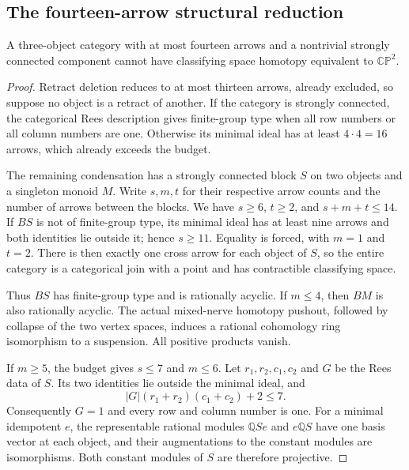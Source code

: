 \subsection{The fourteen-arrow structural reduction}

\begin{lemma}\label{C:fourteen-three-SCC}
A three-object category with at most fourteen arrows and a
nontrivial strongly connected component cannot have classifying
space homotopy equivalent to $\mathbb{CP}^2$.
\end{lemma}
\begin{proof}
Retract deletion reduces to at most thirteen arrows, already
excluded, so suppose no object is a retract of another.
If the category is strongly connected, the categorical Rees
description gives finite-group type when all row numbers or all
column numbers are one. Otherwise its minimal ideal has at least
$4\cdot4=16$ arrows, which already exceeds the budget.

The remaining condensation has a strongly connected block $S$
on two objects and a singleton monoid $M$. Write $s,m,t$ for
their respective arrow counts and the number of arrows between
the blocks. We have $s\geq6$, $t\geq2$, and $s+m+t\leq14$.
If $BS$ is not of finite-group type, its minimal ideal has at
least nine arrows and both identities lie outside it; hence
$s\geq11$. Equality is forced, with $m=1$ and $t=2$.
There is then exactly one cross arrow for each object of $S$,
so the entire category is a categorical join with a point and
has contractible classifying space.

Thus $BS$ has finite-group type and is rationally acyclic.
If $m\leq4$, then $BM$ is also rationally acyclic. The actual
mixed-nerve homotopy pushout, followed by collapse of the two
vertex spaces, induces a rational cohomology ring isomorphism
to a suspension. All positive products vanish.

If $m\geq5$, the budget gives $s\leq7$ and $m\leq6$.
Let $r_1,r_2,c_1,c_2$ and $G$ be the Rees data of $S$.
Its two identities lie outside the minimal ideal, and
\[
 |G|(r_1+r_2)(c_1+c_2)+2\leq7.
\]
Consequently $G=1$ and every row and column number is one.
For a minimal idempotent $e$, the representable rational modules
$\mathbb QS e$ and $e\mathbb QS$ have one basis vector at each
object, and their augmentations to the constant modules are
isomorphisms. Both constant modules of $S$ are therefore projective.


\end{proof}
